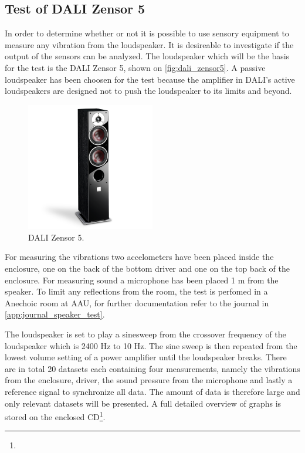 \subsection*{Test of DALI Zensor 5}
In order to determine whether or not it is possible to use sensory equipment to measure any vibration from the loudspeaker. It is desireable to investigate if the output of the sensors can be analyzed. The loudspeaker which will be the basis for the test is the DALI Zensor 5, shown on \autoref{fig:dali_zensor5}. A passive loudspeaker has been choosen for the test because the amplifier in DALI's active loudspeakers are designed not to push the loudspeaker to its limits and beyond. %

\begin{figure}[H]
\centering
\includegraphics[width=0.5\textwidth]{figures/zensor5.png}
\caption{DALI Zensor 5.}
\label{fig:dali_zensor5}
\end{figure}


For measuring the vibrations two accelometers have been placed inside the enclosure, one on the back of the bottom driver and one on the top back of the enclosure. For measuring sound a microphone has been placed 1 m from the speaker. To limit any reflections from the room, the test is perfomed in a Anechoic room at \gls{AAU}, for further documentation refer to the journal in \autoref{app:journal_speaker_test}.  



The loudspeaker is set to play a sinesweep from the crossover frequency of the loudspeaker which is 2400 Hz to 10 Hz. The sine sweep is then repeated from the lowest volume setting of a power amplifier until the loudspeaker breaks. There are in total 20 datasets each containing four measurements, namely the vibrations from the enclosure, driver, the sound pressure from the microphone and lastly a reference signal to synchronize all data. The amount of data is therefore large and only relevant datasets will be presented.  A full detailed overview of graphs is stored on the enclosed CD\footnote{}.



